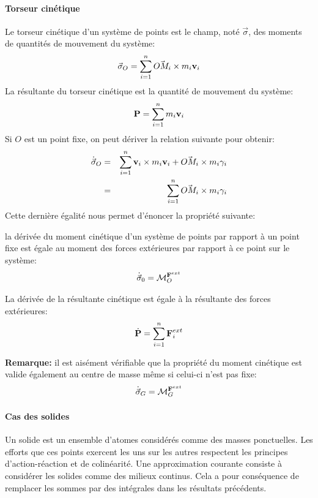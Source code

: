 \paragraph{Torseur cinétique}

Le torseur cinétique d'un système de points est le champ, noté $\vec{\sigma}$, des
moments de quantités de mouvement du système:
$$
\vec{\sigma}_{O} = \sum_{i=1}^n \vec{OM_i} \crossprod m_i \vi
$$
La résultante du torseur cinétique est la quantité de mouvement du
système:
$$
\vect{P} = \sum_{i=1}^n m_i \vi
$$
Si $O$ est un point fixe, on peut dériver la relation suivante
pour obtenir:
\begin{eqnarray*}
  \dot{\vec{\sigma}}_O &=& \sum_{i=1}^n \vi \crossprod m_i \vi + \vec{OM_i}
  \crossprod m_i \gammai \\
  &=& \sum_{i=1}^n \vec{OM_i} \crossprod m_i \gammai
\end{eqnarray*}
Cette dernière égalité nous permet d'énoncer la propriété suivante:
\begin{property}
  la dérivée du moment cinétique d'un système de points par rapport à un
  point fixe est égale au
  moment des forces extérieures par rapport à ce point sur le système:
  \begin{equation}\label{eq:newton3}
    \dot{\vec{\sigma}}_0 = \moment{\vect{F}^{ext}}{O}
  \end{equation}

  La dérivée de la résultante cinétique est égale à la résultante des
  forces extérieures:
  \begin{equation}\label{eq:newton2}
    \dot{\vect{P}} = \sum_{i=1}^n \vect{F}_i^{ext}
  \end{equation}

\end{property}

\textbf{Remarque:} il est aisément vérifiable que la propriété du
moment cinétique est valide également au centre de masse même si
celui-ci n'est pas fixe:
$$
\dot{\vec{\sigma}}_G = \moment{\vect{F}^{ext}}{G}
$$

\paragraph{Cas des solides}

Un solide est un ensemble d'atomes considérés comme des masses
ponctuelles. Les efforts que ces points exercent les uns sur les
autres respectent les principes d'action-réaction et de colinéarité.
Une approximation courante consiste à considérer les solides comme des
milieux continus. Cela a pour conséquence de remplacer les sommes par
des intégrales dans les résultats précédents.

